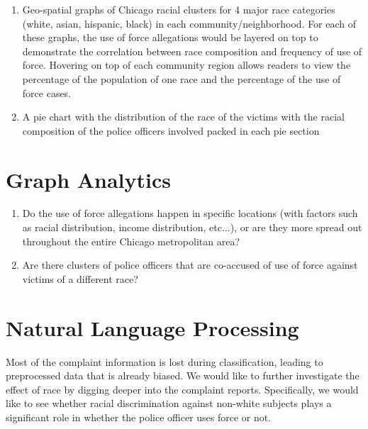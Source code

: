 \documentclass[10pt]{article}
\begin{document}
\begin{enumerate}

\item Geo-spatial graphs of Chicago racial clusters for 4 major race categories (white, asian, hispanic, black) in each community/neighborhood. For each of these graphs, the use of force allegations would be layered on top to demonstrate the correlation between race composition and frequency of use of force. Hovering on top of each community region allows readers to view the percentage of the population of one race and the percentage of the use of force cases.

\item A pie chart with the distribution of the race of the victims with the racial composition of the police officers involved packed in each pie section

\end{enumerate}




\section{Graph Analytics}

\begin{enumerate}

\item Do the use of force allegations happen in specific locations (with factors such as racial distribution, income distribution, etc...), or are they more spread out throughout the entire Chicago metropolitan area?

\item Are there clusters of police officers that are co-accused of use of force against victims of a different race?

\end{enumerate}



\section{Natural Language Processing}

Most of the complaint information is lost during classification, leading to preprocessed data that is already biased. We would like to further investigate the effect of race by digging deeper into the complaint reports. Specifically, we would like to see whether racial discrimination against non-white subjects plays a significant role in whether the police officer uses force or not.
\end{document}
